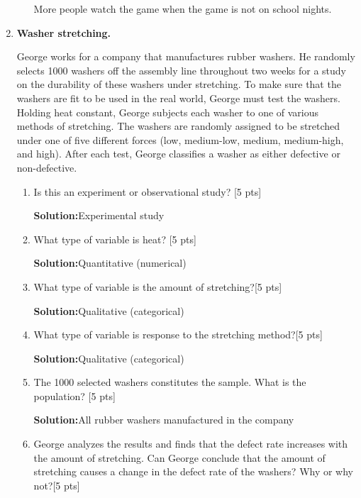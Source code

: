 \documentclass[11pt]{article}\usepackage[]{graphicx}\usepackage[]{color}
\begin{document}
\begin{enumerate}
\begin{enumerate}
More people watch the game when the game is not on school nights. 
    
   
    \end{enumerate}
    
\item \textbf{Washer stretching.}
  
George works for a company that manufactures  rubber washers.  He randomly selects 1000  washers off the assembly line throughout two weeks for a study on the durability of these washers under   stretching.  To make sure that the washers  are fit to be used in the real world, George must test  the washers.  Holding heat constant,  George subjects each washer to one of various methods of  stretching.  The washers are randomly assigned to be stretched under one of five different forces (low, medium-low, medium, medium-high, and high). After each test, George classifies  a washer as either defective or non-defective. 
 
    \begin{enumerate}
    \item Is this an experiment or observational study? [5 pts]
    
    \textbf{Solution:}Experimental study

    
    \item What type of variable is heat? [5 pts]
    
    \textbf{Solution:}Quantitative (numerical)

     
    \item What type of variable is the amount of stretching?[5 pts] 
    
    \textbf{Solution:}Qualitative (categorical)

     
    \item What type of variable is response to the stretching method?[5 pts]
    
    \textbf{Solution:}Qualitative (categorical)

     
    \item The 1000 selected washers constitutes the sample. What is the population? [5 pts]
    
    \textbf{Solution:}All rubber washers manufactured in the company

    
    \item George analyzes the results and finds that the defect rate increases with the amount of stretching. Can George conclude that the amount of stretching  causes a change in the defect rate of the washers? Why or why not?[5 pts]
    

\end{enumerate}
\end{enumerate}
\end{document}
